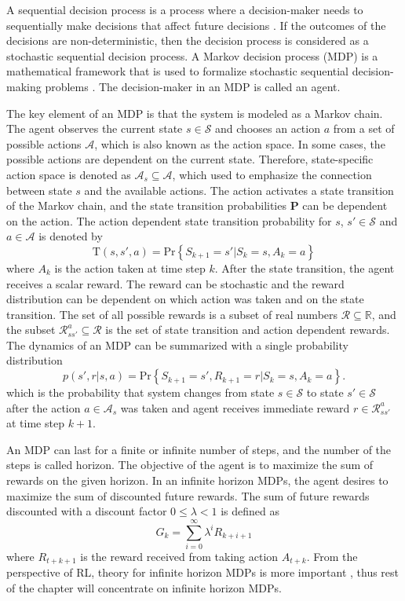 \documentclass[english, 12pt, a4paper, elec, utf8, a-1b, online]{aaltothesis}
\renewcommand{\vec}[1]{\mathbf{#1}}
\newcommand{\Ss}{\mathcal{S}}
\newcommand{\As}{\mathcal{A}}
\newcommand{\Rs}{\mathcal{R}}
\renewcommand{\Pr}[1]{\text{Pr}\left\{ #1 \right\}}
\newcommand{\stprobs}{\vec{P}}
\newcommand{\real}{\mathbb{R}}
\begin{document}
A sequential decision process is a process where a decision-maker needs to sequentially make decisions that affect future decisions \cite{LaValle2006}.
If the outcomes of the decisions are non-deterministic, then the decision process is considered as a stochastic sequential decision process.
A Markov decision process (MDP) is a mathematical framework that is used to formalize stochastic sequential decision-making problems \cite{Sutton2018}.
The decision-maker in an MDP is called an agent.

The key element of an MDP is that the system is modeled as a Markov chain.
The agent observes the current state $s \in \Ss$ and chooses an action $a$ from a set of possible actions $\As$, which is also known as the action space.
In some cases, the possible actions are dependent on the current state.
Therefore, state-specific action space is denoted as $\As_s \subseteq \As$, which used to emphasize the connection between state $s$ and the available actions. 
The action activates a state transition of the Markov chain, and the state transition probabilities $\stprobs$ can be dependent on the action.
The action dependent state transition probability for $s$, $s' \in \Ss$ and $a \in \As$ is denoted by 
\begin{equation}\label{eq:mdp_st_prob}
    \mathrm{T}(s, s', a) = \Pr{S_{k+1}=s' | S_{k}=s , A_k=a}
\end{equation}
where $A_k$ is the action taken at time step $k$.  
After the state transition, the agent receives a scalar reward.
The reward can be stochastic and the reward distribution can be dependent on which action was taken and on the state transition.
The set of all possible rewards is a subset of real numbers $\Rs \subseteq \real$, and the subset $\Rs_{ss'}^a \subseteq \Rs$ is the set of state transition and action dependent rewards.
The dynamics of an MDP can be summarized with a single probability distribution
\begin{equation}\label{eq:MDP_probs}
    p(s', r | s, a) = \Pr{ S_{k+1}=s', R_{k+1}=r | S_k=s, A_k=a }.
\end{equation}
which is the probability that system changes from state $s \in \Ss$ to state $s' \in \Ss$ after the action $a \in \As_s$ was taken and agent receives immediate reward $r \in \Rs_{ss'}^a$ at time step $k+1$.

An MDP can last for a finite or infinite number of steps, and the number of the steps is called horizon.
The objective of the agent is to maximize the sum of rewards on the given horizon.
In an infinite horizon MDPs, the agent desires to maximize the sum of discounted future rewards.
The sum of future rewards discounted with a discount factor $0 \leq \lambda < 1$ is defined as
\begin{equation}\label{eq:discounted_sum}
    G_k = \sum_{i=0}^{\infty} \lambda^i R_{k + i + 1}
\end{equation}
where $R_{t+k+1}$ is the reward received from taking action $A_{t+k}$. 
From the perspective of RL, theory for infinite horizon MDPs is more important \cite{Sutton2018}, thus rest of the chapter will concentrate on infinite horizon MDPs.
\end{document}
